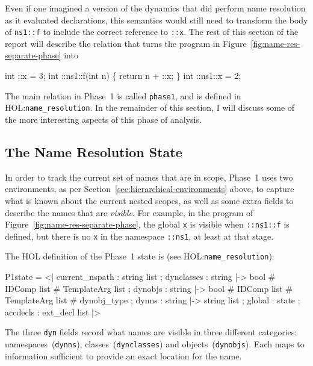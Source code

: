 \documentclass[11pt]{article}
\newcommand{\HOLfile}[1]{HOL:\texttt{#1}}
\begin{document}
Even if one imagined a version of the dynamics that did perform name
resolution as it evaluated declarations, this semantics would still
need to transform the body of \texttt{ns1::f} to include the correct
reference to \texttt{::x}.  The rest of this section of the report
will describe the relation that turns the program in
Figure~\ref{fig:name-res-separate-phase} into
\begin{stdrule}
   int ::x = 3;
   int ::ns1::f(int n) \{ return n + ::x; \}
   int ::ns1::x = 2;
\end{stdrule}

\bigskip\noindent The main relation in Phase~1 is called
\texttt{phase1}, and is defined in \HOLfile{name_resolution}.  In the
remainder of this section, I will discuss some of the more interesting
aspects of this phase of analysis.

\subsection{The Name Resolution State}
\label{sec:name-resol-state}

In order to track the current set of names that are in scope, Phase~1
uses two environments, as per
Section~\ref{sec:hierarchical-environments} above, to capture what is
known about the current nested scopes, as well as some extra fields to
describe the names that are \emph{visible}.  For example, in the
program of Figure~\ref{fig:name-res-separate-phase}, the global
\texttt{x} is visible when \texttt{::ns1::f} is defined, but there is
no \texttt{x} in the namespace \texttt{::ns1}, at least at that stage.

The HOL definition of the Phase~1 state is (see
\HOLfile{name_resolution}):
\begin{stdrule}
   P1state = <|
     current_nspath : string list ;
     dynclasses : string |-> bool # IDComp list #
                             TemplateArg list ;
     dynobjs : string |-> bool # IDComp list #
                          TemplateArg list # dynobj_type ;
     dynns : string |-> string list ;
     global : state ;
     accdecls : ext_decl list
   |>
\end{stdrule}
The three \texttt{dyn} fields record what names are visible in three
different categories: namespaces~(\texttt{dynns}),
classes~(\texttt{dynclasses}) and objects~(\texttt{dynobjs}).  Each
maps to information sufficient to provide an exact location for the
name.
\end{document}
